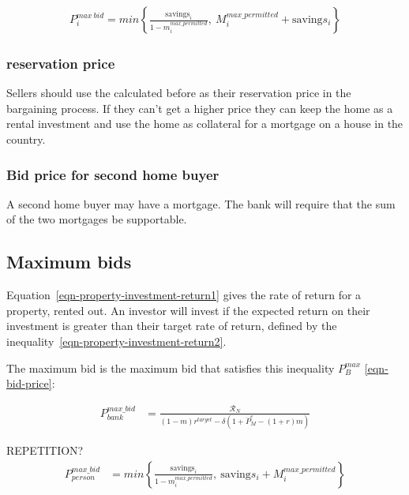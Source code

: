 \begin{align}
P_i^{max\ bid}= min \left\{\frac{\mathrm{savings}_i}{1-m_i^{max\_permitted}},\  M_i^{max\_permitted} + \mathrm{saving}s_i  \right\}     
\end{align}
 

 

\subsubsection{reservation price}
Sellers should use the calculated before  as their reservation price in the bargaining process. If they can't get a higher price they  can keep the home as a rental  investment and use the home as collateral for a mortgage on a house in the country.

\subsubsection{Bid price for second home buyer}
A second home buyer may have a mortgage. The bank will require that the sum of the two mortgages be supportable. 




\subsection{Maximum bids}

Equation~\ref{eqn-property-investment-return1} gives the rate of return for a property, rented out. An investor will invest if the expected return on their investment is greater than their target rate of return, %
defined by the inequality~\ref{eqn-property-investment-return2}. 

The maximum bid is the maximum bid that satisfies this inequality $P_B^{max}$  \ref{eqn-bid-price}:



\begin{eqnarray}
P_{bank}^{max\_bid} & =   \frac{\mathcal{R}_N}{(1-m)r^{target}-\delta \left(1 + \dot P_M^e - (1+r)m\right)} \label{eqn-bid-price-B} \end{eqnarray}


REPETITION?
\begin{eqnarray}
P_{person}^{max\_bid} & = min \left\{\frac{\mathrm{savings}_i}{1-m_i^{max\_permitted}},\ \mathrm{saving}s_i + M_i^{max\_permitted}  \right\}  \nonumber
\end{eqnarray}



